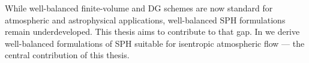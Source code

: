 \documentclass[../main.tex]{subfiles}
\begin{document}
While well-balanced finite-volume and DG schemes are now standard for atmospheric and astrophysical applications, well-balanced SPH formulations remain underdeveloped. This thesis aims to contribute to that gap. In  we derive well-balanced formulations of SPH suitable for isentropic atmospheric flow --- the central contribution of this thesis.
\end{document}
